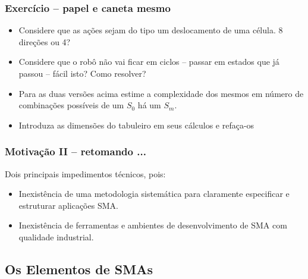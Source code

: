 \begin{frame}

\frametitle{Exercício -- papel e caneta mesmo}
   
\begin{block}{}

  \begin{itemize}
  \item Considere que as ações sejam do tipo um deslocamento de uma célula. 8 direções ou 4?
  \pause
  \item Considere que o robô não vai ficar em ciclos -- passar em estados que já passou -- fácil isto? Como resolver?
  \pause
  
  \item   Para as duas versões acima estime a complexidade dos mesmos em número
  de combinações possíveis de um $S_0$ há um $S_m$.
  \pause
  
   \item Introduza as dimensões do tabuleiro em seus cálculos e refaça-os
  \end{itemize}  
  
\end{block}
   
\end{frame}



\begin{frame}

    \frametitle{Motivação II -- retomando ...}
   Dois principais impedimentos técnicos, pois:
  \begin{itemize}
  \pause
  \item Inexistência de uma metodologia sistemática para 
      claramente especificar e estruturar aplicações SMA.
  \pause
  \item Inexistência de ferramentas e ambientes de 
desenvolvimento de SMA com qualidade industrial.
    
  \end{itemize}

\end{frame}


\subsection{Os Elementos de SMAs}

